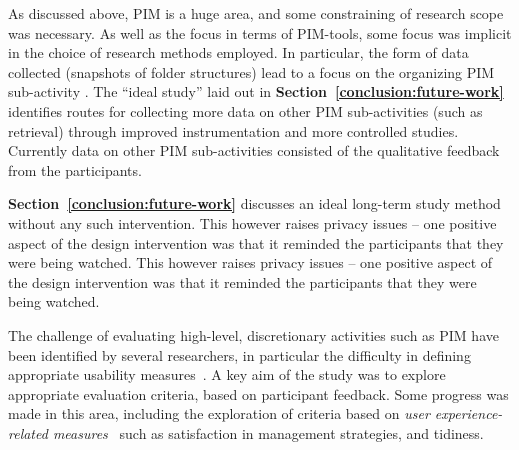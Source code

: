As discussed above, PIM is a huge area, and some constraining of research scope was necessary.  As well as the focus in terms of PIM-tools, some focus was implicit in the choice of research methods employed.  In particular, the form of data collected (snapshots of folder structures) lead to a focus on the organizing PIM sub-activity .  The ``ideal study'' laid out in \textbf{Section~\ref{conclusion:future-work}} identifies routes for collecting more data on other PIM sub-activities (such as retrieval) through improved instrumentation and more controlled studies. Currently data on other PIM sub-activities consisted of the qualitative feedback from the participants.

\textbf{Section~\ref{conclusion:future-work}} discusses an ideal long-term study method without any such intervention.  This however raises privacy issues -- one positive aspect of the design intervention was that it reminded the participants that they were being watched.
This however raises privacy issues -- one positive aspect of the design intervention was that it reminded the participants that they were being watched.

The challenge of evaluating high-level, discretionary activities such as PIM have been identified by several researchers, in particular the difficulty in defining appropriate usability measures~\citep{ad:01}.  
A key aim of the study was to explore appropriate evaluation criteria, based on participant feedback.  Some progress was made in this area, including the exploration of criteria based on \textit{user experience-related measures}~\cite{Friedman:03} such as satisfaction in management strategies, and tidiness.

